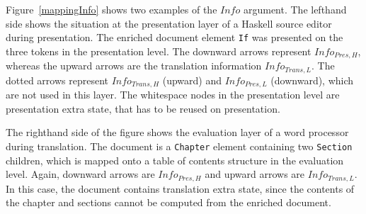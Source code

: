 \bc
Figure~\ref{mappingInfo} shows two examples of the $Info$ argument. The lefthand side shows the situation at the presentation layer of a Haskell source editor during presentation.  The enriched document element \verb|If|  was presented on the three tokens in the presentation level. The downward arrows represent $Info_{Pres,H}$, whereas the upward arrows are the translation information $Info_{Trans, L}$. The dotted arrows represent $Info_{Trans,H}$ (upward) and $Info_{Pres,L}$ (downward), which are not used in this layer. The whitespace nodes in the presentation level are presentation extra state, that has to be reused on presentation. 

The righthand side of the figure shows the evaluation layer of a word processor during translation. The document is a \verb|Chapter| element containing two \verb|Section| children, which is mapped onto a table of contents structure in the evaluation level. Again, downward arrows are $Info_{Pres,H}$ and upward arrows are $Info_{Trans,L}$.  In this case, the document contains translation extra state, since the contents of the chapter and sections cannot be computed from the enriched document.  

